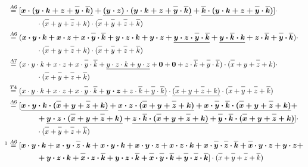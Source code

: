 \documentclass{article}
\newcommand*{\oline}[1]{\overline{#1\mathstrut}}
\newcommand{\bigspace}{\quad\quad\quad\quad}
\begin{document}
\begin{align*}
  &\overset{A6}{=} [\bm{\underline{x \cdot (y \cdot k + z + \oline{y} \cdot \oline{k})} + \underline{(y \cdot z) \cdot (y \cdot k + z + \oline{y} \cdot \oline{k})} + \underline{\oline{k} \cdot (y \cdot k + z + \oline{y} \cdot \oline{k})}}] \cdot\\
  &\bigspace \cdot (\oline{x}+y+\oline{z}+k) \cdot (\oline{x}+\oline{y}+\oline{z}+\oline{k})\\
  &\overset{A6}{=} (\bm{x \cdot y \cdot k + x \cdot z + x \cdot \oline{y} \cdot \oline{k} + y \cdot z \cdot k + y \cdot z + \underline{y \cdot z \cdot \oline{y} \cdot \oline{k}} + \underline{y \cdot \oline{k} \cdot k} + z \cdot \oline{k} + \oline{y} \cdot \oline{k}}) \cdot\\
  &\bigspace \cdot (\oline{x}+y+\oline{z}+k) \cdot (\oline{x}+\oline{y}+\oline{z}+\oline{k})\\
  &\overset{A7}{=} (x \cdot y \cdot k + x \cdot z + x \cdot \oline{y} \cdot \oline{k} + \underline{y \cdot z \cdot k + y \cdot z} + \bm{0} + \bm{0} + z \cdot \oline{k} + \oline{y} \cdot \oline{k}) \cdot (\oline{x}+y+\oline{z}+k) \cdot\\
  &\bigspace \cdot (\oline{x}+\oline{y}+\oline{z}+\oline{k})\\
  &\overset{T4}{=} \underline{(x \cdot y \cdot k + x \cdot z + x \cdot \oline{y} \cdot \oline{k} + \bm{y \cdot z} + z \cdot \oline{k} + \oline{y} \cdot \oline{k})} \cdot \underline{(\oline{x}+y+\oline{z}+k)} \cdot  (\oline{x}+\oline{y}+\oline{z}+\oline{k})\\
  &\overset{A6}{=} [\bm{\underline{x \cdot y \cdot k \cdot (\oline{x}+y+\oline{z}+k)} + \underline{x \cdot z \cdot (\oline{x}+y+\oline{z}+k)} + \underline{x \cdot \oline{y} \cdot \oline{k} \cdot (\oline{x}+y+\oline{z}+k)} +}\\
  &\bigspace \bm{+ \underline{y \cdot z \cdot (\oline{x}+y+\oline{z}+k)} + \underline{z \cdot \oline{k} \cdot (\oline{x}+y+\oline{z}+k)} + \underline{\oline{y} \cdot \oline{k} \cdot (\oline{x}+y+\oline{z}+k)}}] \cdot\\
  &\bigspace \cdot (\oline{x}+\oline{y}+\oline{z}+\oline{k})\\
  \footnotemark[1]&\overset{A6}{=} [\bm{x \cdot y \cdot k + x \cdot y \cdot \oline{z} \cdot k + x \cdot y \cdot k + x \cdot y \cdot z + x \cdot z \cdot k + x \cdot \oline{y} \cdot \oline{z} \cdot \oline{k} + \oline{x} \cdot y \cdot z + y \cdot z +}\\
  &\bigspace \bm{+ y \cdot z \cdot k + \oline{x} \cdot z \cdot \oline{k} + y \cdot z \cdot \oline{k} + \oline{x} \cdot \oline{y} \cdot \oline{k} + \oline{y} \cdot \oline{z} \cdot \oline{k}}] \cdot (\oline{x}+\oline{y}+\oline{z}+\oline{k})\\

\end{align*}
\end{document}
